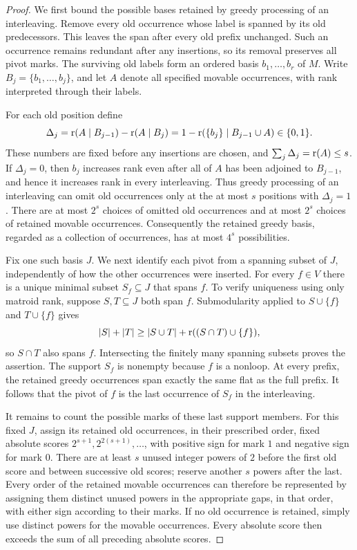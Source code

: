 \begin{proof}
We first bound the possible bases retained by greedy processing of an
interleaving.  Remove every old occurrence whose label is spanned by its old
predecessors.  This leaves the span after every old prefix unchanged.
Such an occurrence remains redundant after any insertions, so its
removal preserves all pivot marks.  The surviving old labels form an
ordered basis $b_1,\ldots,b_r$ of $M$.  Write
$B_j=\{b_1,\ldots,b_j\}$, and let $A$ denote all specified movable
occurrences, with rank interpreted through their labels.

For each old position define
\[
 \Delta_j=
 \operatorname{r}(A\mid B_{j-1})-\operatorname{r}(A\mid B_j)
 =1-\operatorname{r}(\{b_j\}\mid B_{j-1}\cup A)\in\{0,1\}.
\]
These numbers are fixed before any insertions are chosen, and
$\sum_j\Delta_j=\operatorname{r}(A)\le s$.
If $\Delta_j=0$, then $b_j$ increases rank even after all of $A$ has
been adjoined to $B_{j-1}$, and hence it increases rank in every
interleaving.  Thus greedy processing of an interleaving can omit old
occurrences only at the at most $s$ positions with $\Delta_j=1$.
There are at most $2^s$ choices of omitted old occurrences and at most
$2^s$ choices of retained movable occurrences.  Consequently the
retained greedy basis, regarded as a collection of occurrences, has at
most $4^s$ possibilities.

Fix one such basis $J$.  We next identify each pivot from a spanning
subset of $J$, independently of how the other occurrences were inserted.
For every $f\in V$ there is a unique minimal
subset $S_f\subseteq J$ that spans $f$.  To verify uniqueness using only
matroid rank, suppose $S,T\subseteq J$ both span $f$.  Submodularity
applied to $S\cup\{f\}$ and $T\cup\{f\}$ gives
\[
 |S|+|T|\ge |S\cup T|+\operatorname{r}((S\cap T)\cup\{f\}),
\]
so $S\cap T$ also spans $f$.  Intersecting the finitely many spanning
subsets proves the assertion.  The support $S_f$ is nonempty because
$f$ is a nonloop.  At every prefix, the retained greedy occurrences
span exactly the same flat as the full prefix.  It follows that the
pivot of $f$ is the last occurrence of $S_f$ in the interleaving.

It remains to count the possible marks of these last support members.
For this fixed $J$, assign its retained old occurrences, in their
prescribed order, fixed absolute scores
$2^{s+1},2^{2(s+1)},\ldots$, with positive sign for mark $1$ and
negative sign for mark $0$.  There are at least $s$ unused integer
powers of $2$ before the first old score and between successive old
scores; reserve another $s$ powers after the last.  Every order of the
retained movable occurrences can therefore be represented by assigning
them distinct unused powers in the appropriate gaps, in that order,
with either sign according to their marks.  If no old occurrence is
retained, simply use distinct powers for the movable occurrences.
Every absolute score then exceeds the sum of all preceding absolute
scores.


\end{proof}
